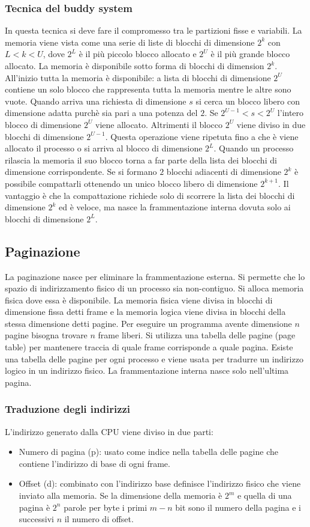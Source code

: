 \subsubsection{Tecnica del buddy system}
In questa tecnica si deve fare il compromesso tra le partizioni fisse e variabili. La memoria viene vista come una serie di liste di blocchi di dimensione $2^k$ con $L < k < U$, dove
$2^L$ \`e il pi\`u piccolo blocco allocato e $2^U$ \`e il pi\`u grande blocco allocato. La memoria \`e disponibile sotto forma di blocchi di dimension $2^k$. All'inizio tutta la memoria
\`e disponibile: a lista di blocchi di dimensione $2^U$ contiene un solo blocco che rappresenta tutta la memoria mentre le altre sono vuote. Quando arriva una richiesta di dimensione $s$
si cerca un blocco libero con dimensione adatta purch\`e sia pari a una potenza del $2$. Se $2^{U-1} < s < 2^U$ l'intero blocco di dimensione $2^U$ viene allocato. Altrimenti il blocco 
$2^U$ viene diviso in due blocchi di dimensione $2^{U-1}$. Questa operazione viene ripetuta fino a che \`e viene allocato il processo o si arriva al blocco di dimensione $2^L$. Quando
un processo rilascia la memoria il suo blocco torna a far parte della lista dei blocchi di dimensione corrispondente. Se si formano $2$ blocchi adiacenti di dimensione $2^k$ \`e 
possibile compattarli ottenendo un unico blocco libero di dimensione $2^{k+1}$. Il vantaggio \`e che la compattazione richiede solo di scorrere la lista dei blocchi di dimensione $2^k$
ed \`e veloce, ma nasce la frammentazione interna dovuta solo ai blocchi di dimensione $2^L$. 
\subsection{Paginazione}
La paginazione nasce per eliminare la frammentazione esterna. Si permette che lo spazio di indirizzamento fisico di un processo sia non-contiguo. Si alloca memoria fisica dove essa \`e
disponibile. La memoria fisica viene divisa in blocchi di dimensione fissa detti frame e la memoria logica viene divisa in blocchi della stessa dimensione detti pagine. Per eseguire
un programma avente dimensione $n$ pagine bisogna trovare $n$ frame liberi. Si utilizza una tabella delle pagine (page table) per mantenere traccia di quale frame corrisponde a quale
pagina. Esiste una tabella delle pagine per ogni processo e viene usata per tradurre un indirizzo logico in un indirizzo fisico. La frammentazione interna nasce solo nell'ultima pagina. 
\subsubsection{Traduzione degli indirizzi}
L'indirizzo generato dalla CPU viene diviso in due parti: 
\begin{itemize}
	\item Numero di pagina (p): usato come indice nella tabella delle pagine che contiene l'indirizzo di base di ogni frame. 
	\item Offset (d): combinato con l'indirizzo base definisce l'indirizzo fisico che viene inviato alla memoria. Se la dimensione della memoria \`e $2^m$ e quella di una pagina \`e
		$2^n$ parole per byte i primi $m-n$ bit sono il numero della pagina e i successivi $n$ il numero di offset. 
\end{itemize}
